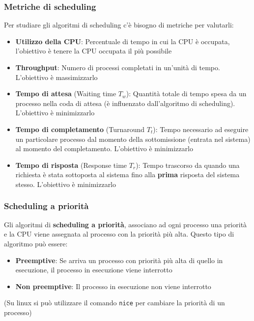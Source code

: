 \documentclass[a4paper]{article}
\begin{document}
\subsubsection{Metriche di scheduling}
Per studiare gli algoritmi di scheduling c'è bisogno di metriche per valutarli:
\begin{itemize}
  \item \textbf{Utilizzo della CPU}: Percentuale di tempo in cui la CPU è occupata,
    l'obiettivo è tenere la CPU occupata il più possibile
  \item \textbf{Throughput}: Numero di processi completati in un'unità di tempo.
    L'obiettivo è massimizzarlo
  \item \textbf{Tempo di attesa} (Waiting time \( T_w \)): Quantità totale di tempo 
    spesa da un processo nella coda di attesa (è influenzato dall'algoritmo di 
    scheduling). L'obiettivo è minimizzarlo
  \item \textbf{Tempo di completamento} (Turnaround \( T_t \)): Tempo necessario ad
    eseguire un particolare processo dal momento della sottomissione (entrata nel sistema)
    al momento del completamento. L'obiettivo è minimizzarlo
  \item \textbf{Tempo di risposta} (Response time \( T_r \)): Tempo trascorso da quando
    una richiesta è stata sottoposta al sistema fino alla \textbf{prima} risposta del 
    sistema stesso. L'obiettivo è minimizzarlo
\end{itemize}

\subsubsection{Scheduling a priorità}
Gli algoritmi di \textbf{scheduling a priorità}, associano ad ogni processo
una priorità e la CPU viene assegnata al processo con la priorità 
più alta. Questo tipo di algoritmo può essere:
\begin{itemize}
  \item \textbf{Preemptive}: Se arriva un processo con priorità più alta di quello in
    esecuzione, il processo in esecuzione viene interrotto
  \item \textbf{Non preemptive}: Il processo in esecuzione non viene interrotto
\end{itemize}
(Su linux si può utilizzare il comando \texttt{nice} per cambiare la priorità di un
processo)
\end{document}
